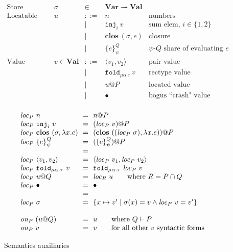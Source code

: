 \documentclass[10pt]{article}
\makeatletter
\newcommand{\kw}[1]{\ensuremath{\mathtt{#1}}}
\newcommand{\trec}[2]{\ensuremath{\mu {#1}.{#2}}}
\newcommand{\einj}[2]{\ensuremath{\kw{inj}_{#1}~{#2}}}
\newcommand{\epair}[2]{\ensuremath{\langle {#1}, {#2} \rangle}}
\newcommand{\elam}[2]{\ensuremath{\lambda {#1}.{#2}}}
\newcommand{\efold}[2]{\ensuremath{\kw{fold}_{#1}~{#2}}}
\newcommand{\vshare}[3]{\ensuremath{\{{#3}\}^{#1}_{#2}}}
\newcommand{\vloc}[2]{\ensuremath{{#1}\kw{@}{#2}}}
\newcommand{\vclos}[2]{\ensuremath{\mathbf{clos}~({#1},{#2})}}
\newcommand{\vcrash}{\ensuremath{\bullet}}
\newcommand{\env}{\ensuremath{\sigma}}
\newcommand{\locof}[2]{\ensuremath{\mathit{loc}_{#1}~{#2}}}
\newcommand{\getat}[2]{\ensuremath{\mathit{on}_{#1}~{#2}}}
\makeatother
\begin{document}
\begin{figure}
  \[\begin{array}{rlcll}
      \text{Store} & \sigma & \in & \mathbf{Var} \rightharpoonup \mathbf{Val}\\
      \text{Locatable value} & u & ::=  & n & \text{numbers} \\
                             && \mid & \einj{i}{v} & \text{sum elem, }i \in \{1,2\}\\
                             && \mid & \vclos{\env}{e}  & \text{closure} \\
                             && \mid & \vshare{Q}{\psi}{e} & \text{$\psi$-$Q$ share of evaluating $e$} \\
      \text{Value} & v  \in \mathbf{Val} & ::=  & \epair{v_1}{v_2} & \text{pair value}\\
                       && \mid & \efold{\trec{\alpha}{\tau}}{v} & \text{rectype value}\\
                   && \mid & \vloc{u}{P} & \text{located value}\\
                   && \mid & \vcrash & \text{bogus ``crash" value}\\
    \end{array}
  \]

\[\begin{array}{l@{~~=~~}l}
    \locof{P}{n} & \vloc{n}{P} \\
    \locof{P}{\einj{i}{v}} & \vloc{(\locof{P}{v})}{P} \\
    \locof{P}{\vclos{\env}{\elam{x}{e}}} & \vloc{(\vclos{(\locof{P}{\env})}{\elam{x}{e}})}{P}\\
    \locof{P}{\vshare{Q}{\psi}{e}} & \vloc{(\vshare{Q}{\psi}{e})}{P}
    \\ \\
    \locof{P}{\epair{v_1}{v_2}} & \epair{\locof{P}{v_1}}{\locof{P}{v_2}}\\
    \locof{P}{ \efold{\trec{\alpha}{\tau}}{v}} &  \efold{\trec{\alpha}{\tau}}{\locof{P}{v}}\\
    \locof{P}{\vloc{u}{Q}} & \locof{R}{u} \qquad\text{where }R = P \cap Q\\
    \locof{P}{\vcrash} & \vcrash
    \\ \\
    \locof{P}{\sigma} & \{ x \mapsto v' \mid \sigma(x) = v \land \locof{P}{v} = v' \}\\
    \multicolumn{2}{c}{}\\
    \getat{P}{(\vloc{u}{Q})} & u \qquad \text{where }Q \vdash P\\
    \getat{P}{v} & v \qquad \text{for all other $v$ syntactic forms}\\
  \end{array}
\]
\caption{Semantics auxiliaries}
\label{fig:auxsem}
\end{figure}
\end{document}
